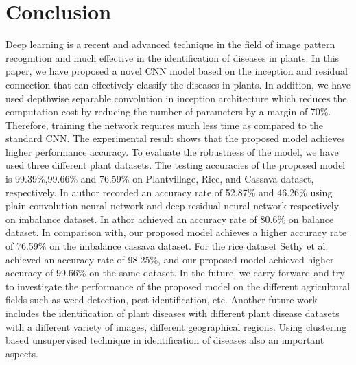 \section{Conclusion} \label{s5-en}
Deep learning is a recent and advanced technique in the field of image pattern recognition and much effective in the identification of diseases in plants. In this paper, we have proposed a novel CNN model based on the inception and residual connection that can effectively classify the diseases in plants. In addition, we have used depthwise separable convolution in inception architecture which reduces the computation cost by reducing the number of parameters by a margin of 70\%. Therefore, training the network requires much less time as compared to the standard CNN. The experimental result shows that the proposed model achieves higher performance accuracy. To evaluate the robustness of the model, we have used three different plant datasets. The testing accuracies of the proposed model is 99.39\%,99.66\% and 76.59\% on Plantvillage, Rice, and Cassava dataset, respectively. In  author recorded an accuracy rate of 52.87\% and 46.26\% using plain convolution neural network and deep residual neural network respectively on imbalance dataset. In athor achieved an accuracy rate of 80.6\% on balance dataset. In comparison with, our proposed model achieves a higher accuracy rate of 76.59\% on the imbalance cassava dataset. For the rice dataset Sethy et al. achieved an accuracy rate of 98.25\%, and our proposed model achieved higher accuracy of 99.66\% on the same dataset. In the future, we carry forward and try to investigate the performance of the proposed model on the different agricultural fields such as weed detection, pest identification, etc. Another future work includes the identification of plant diseases with different plant disease datasets with a different variety of images, different geographical regions. Using clustering based unsupervised technique in identification of diseases also an important aspects.


